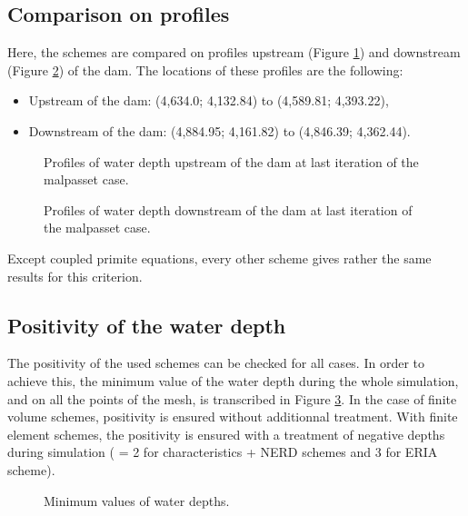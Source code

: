 \subsection{Comparison on profiles}
Here, the schemes are compared on profiles upstream
(Figure \ref{fig:malpasset:upstreamProfile}) and downstream (Figure
\ref{fig:malpasset:downstreamProfile}) of the dam.
The locations of these profiles are the following:
\begin{itemize}
\itemsep0em
\item Upstream of the dam: (4,634.0; 4,132.84) to (4,589.81; 4,393.22),
\item Downstream of the dam: (4,884.95; 4,161.82) to (4,846.39; 4,362.44).
\end{itemize}

\begin{figure}[H]
  \centering
  \caption{Profiles of water depth upstream of the dam at last iteration of the malpasset case.}
  \label{fig:malpasset:upstreamProfile}
\end{figure}

\begin{figure}[H]
  \centering
  \caption{Profiles of water depth downstream of the dam at last iteration of the malpasset case.}
  \label{fig:malpasset:downstreamProfile}
\end{figure}

Except coupled primite equations, every other scheme gives rather the same
results for this criterion.

\subsection{Positivity of the water depth}

The positivity of the used schemes can be checked for all cases.
In order to achieve this, the minimum value of the water depth during the whole
simulation, and on all the points of the mesh, is transcribed in Figure
\ref{fig:malpasset:minmax}.
In the case of finite volume schemes, positivity is ensured without additionnal
treatment.
With finite element schemes, the positivity is ensured with a treatment of
negative depths during simulation ( = 2
for characteristics + NERD schemes and 3 for ERIA scheme).

\begin{figure}[H]
\centering
{}
\caption{Minimum values of water depths.}
\label{fig:malpasset:minmax}
\end{figure}

